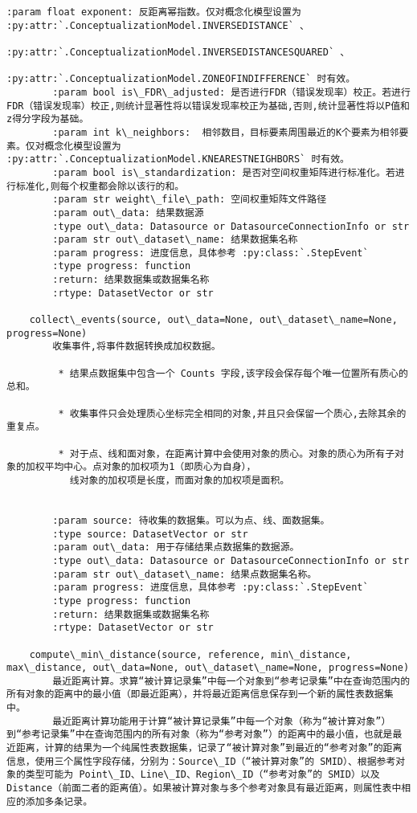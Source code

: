 \documentclass[11pt]{article}
\begin{document}
\begin{Verbatim}[commandchars=\\\{\}]
        :param float exponent: 反距离幂指数。仅对概念化模型设置为 :py:attr:`.ConceptualizationModel.INVERSEDISTANCE` 、
                                         :py:attr:`.ConceptualizationModel.INVERSEDISTANCESQUARED` 、
                                         :py:attr:`.ConceptualizationModel.ZONEOFINDIFFERENCE` 时有效。
        :param bool is\_FDR\_adjusted: 是否进行FDR（错误发现率）校正。若进行FDR（错误发现率）校正,则统计显著性将以错误发现率校正为基础,否则,统计显著性将以P值和z得分字段为基础。
        :param int k\_neighbors:  相邻数目，目标要素周围最近的K个要素为相邻要素。仅对概念化模型设置为 :py:attr:`.ConceptualizationModel.KNEARESTNEIGHBORS` 时有效。
        :param bool is\_standardization: 是否对空间权重矩阵进行标准化。若进行标准化,则每个权重都会除以该行的和。
        :param str weight\_file\_path: 空间权重矩阵文件路径
        :param out\_data: 结果数据源
        :type out\_data: Datasource or DatasourceConnectionInfo or str
        :param str out\_dataset\_name: 结果数据集名称
        :param progress: 进度信息，具体参考 :py:class:`.StepEvent`
        :type progress: function
        :return: 结果数据集或数据集名称
        :rtype: DatasetVector or str
    
    collect\_events(source, out\_data=None, out\_dataset\_name=None, progress=None)
        收集事件,将事件数据转换成加权数据。
        
         * 结果点数据集中包含一个 Counts 字段,该字段会保存每个唯一位置所有质心的总和。
        
         * 收集事件只会处理质心坐标完全相同的对象,并且只会保留一个质心,去除其余的重复点。
        
         * 对于点、线和面对象，在距离计算中会使用对象的质心。对象的质心为所有子对象的加权平均中心。点对象的加权项为1（即质心为自身），
           线对象的加权项是长度，而面对象的加权项是面积。
        
        
        :param source: 待收集的数据集。可以为点、线、面数据集。
        :type source: DatasetVector or str
        :param out\_data: 用于存储结果点数据集的数据源。
        :type out\_data: Datasource or DatasourceConnectionInfo or str
        :param str out\_dataset\_name: 结果点数据集名称。
        :param progress: 进度信息，具体参考 :py:class:`.StepEvent`
        :type progress: function
        :return: 结果数据集或数据集名称
        :rtype: DatasetVector or str
    
    compute\_min\_distance(source, reference, min\_distance, max\_distance, out\_data=None, out\_dataset\_name=None, progress=None)
        最近距离计算。求算“被计算记录集”中每一个对象到“参考记录集”中在查询范围内的所有对象的距离中的最小值（即最近距离），并将最近距离信息保存到一个新的属性表数据集中。
        最近距离计算功能用于计算“被计算记录集”中每一个对象（称为“被计算对象”）到“参考记录集”中在查询范围内的所有对象（称为“参考对象”）的距离中的最小值，也就是最近距离，计算的结果为一个纯属性表数据集，记录了“被计算对象”到最近的“参考对象”的距离信息，使用三个属性字段存储，分别为：Source\_ID（“被计算对象”的 SMID）、根据参考对象的类型可能为 Point\_ID、Line\_ID、Region\_ID（“参考对象”的 SMID）以及 Distance（前面二者的距离值）。如果被计算对象与多个参考对象具有最近距离，则属性表中相应的添加多条记录。
        

\end{Verbatim}
\end{document}
